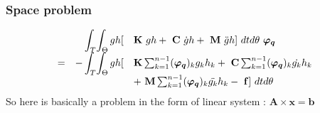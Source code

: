 \documentclass[12pt,a4paper]{article}
\begin{document}
\subsubsection{Space problem}

\begin{equation}
\begin{array}{r r l}
	& \displaystyle
		\int_T \! \int_\Theta
			gh [& \mathbf{K}~ gh
				+ ~\mathbf{C}~ \dot{g}h 
				+ ~\mathbf{M}~ \ddot{g}h
				] ~dt d\theta 
	~ \boldsymbol{\varphi_q}
	\\
	= &- \displaystyle
		\int_T \! \int_\Theta		
			gh [&  \mathbf{K} \sum_{k=1}^{n-1} (\boldsymbol{\varphi_q})_k       g_k  h_k 
				+ ~\mathbf{C} \sum_{k=1}^{n-1} (\boldsymbol{\varphi_q})_k  \dot{g_k} h_k 
		\\ &&
				+ ~\mathbf{M} \sum_{k=1}^{n-1} (\boldsymbol{\varphi_q})_k \ddot{g_k} h_k
				- ~\mathbf{f}] ~dt d\theta				
\end{array}
\end{equation}
So here is basically a problem in the form of linear system : $\boldsymbol{A}\times \boldsymbol{x}=\boldsymbol{b}$
%
\end{document}

